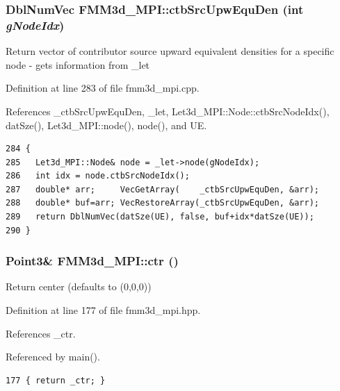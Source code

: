 \subsubsection{\setlength{\rightskip}{0pt plus 5cm}Dbl\-Num\-Vec FMM3d\_\-MPI::ctb\-Src\-Upw\-Equ\-Den (int {\em g\-Node\-Idx})\hspace{0.3cm}{\tt  [protected]}}\label{classFMM3d__MPI_40222f0739fb46c0b1b01ec998e29790_40222f0739fb46c0b1b01ec998e29790}


Return vector of contributor source upward equivalent densities for a specific node - gets information from \_\-let 

Definition at line 283 of file fmm3d\_\-mpi.cpp.

References \_\-ctb\-Src\-Upw\-Equ\-Den, \_\-let, Let3d\_\-MPI::Node::ctb\-Src\-Node\-Idx(), dat\-Sze(), Let3d\_\-MPI::node(), node(), and UE.

\footnotesize\begin{verbatim}284 {
285   Let3d_MPI::Node& node = _let->node(gNodeIdx);
286   int idx = node.ctbSrcNodeIdx();
287   double* arr;     VecGetArray(    _ctbSrcUpwEquDen, &arr);
288   double* buf=arr; VecRestoreArray(_ctbSrcUpwEquDen, &arr);
289   return DblNumVec(datSze(UE), false, buf+idx*datSze(UE));
290 }
\end{verbatim}\normalsize 


\subsubsection{\setlength{\rightskip}{0pt plus 5cm}Point3\& FMM3d\_\-MPI::ctr ()\hspace{0.3cm}{\tt  [inline]}}\label{classFMM3d__MPI_4b21bb4fef46b29bb3fb644f97b12415_4b21bb4fef46b29bb3fb644f97b12415}


Return center (defaults to (0,0,0)) 

Definition at line 177 of file fmm3d\_\-mpi.hpp.

References \_\-ctr.

Referenced by main().

\footnotesize\begin{verbatim}177 { return _ctr; }
\end{verbatim}\normalsize 


